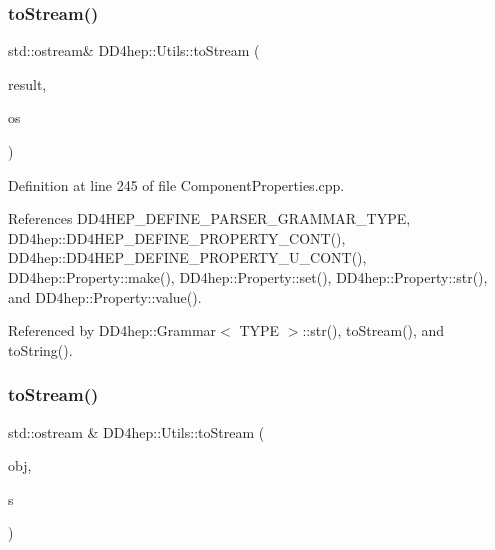 \subsubsection{\texorpdfstring{to\+Stream()}{toStream()}\hspace{0.1cm}{\footnotesize\ttfamily [19/22]}}
{\footnotesize\ttfamily std\+::ostream\& D\+D4hep\+::\+Utils\+::to\+Stream (\begin{DoxyParamCaption}\item[{const \hyperlink{class_d_d4hep_1_1_property}{Property} \&}]{result,  }\item[{std\+::ostream \&}]{os }\end{DoxyParamCaption})}



Definition at line 245 of file Component\+Properties.\+cpp.



References D\+D4\+H\+E\+P\+\_\+\+D\+E\+F\+I\+N\+E\+\_\+\+P\+A\+R\+S\+E\+R\+\_\+\+G\+R\+A\+M\+M\+A\+R\+\_\+\+T\+Y\+PE, D\+D4hep\+::\+D\+D4\+H\+E\+P\+\_\+\+D\+E\+F\+I\+N\+E\+\_\+\+P\+R\+O\+P\+E\+R\+T\+Y\+\_\+\+C\+O\+N\+T(), D\+D4hep\+::\+D\+D4\+H\+E\+P\+\_\+\+D\+E\+F\+I\+N\+E\+\_\+\+P\+R\+O\+P\+E\+R\+T\+Y\+\_\+\+U\+\_\+\+C\+O\+N\+T(), D\+D4hep\+::\+Property\+::make(), D\+D4hep\+::\+Property\+::set(), D\+D4hep\+::\+Property\+::str(), and D\+D4hep\+::\+Property\+::value().



Referenced by D\+D4hep\+::\+Grammar$<$ T\+Y\+P\+E $>$\+::str(), to\+Stream(), and to\+String().

\hypertarget{namespace_d_d4hep_1_1_utils_a2a135f6ca6327240ccb6a2f796c6fc49}{}\label{namespace_d_d4hep_1_1_utils_a2a135f6ca6327240ccb6a2f796c6fc49} 
\subsubsection{\texorpdfstring{to\+Stream()}{toStream()}\hspace{0.1cm}{\footnotesize\ttfamily [20/22]}}
{\footnotesize\ttfamily std\+::ostream \& D\+D4hep\+::\+Utils\+::to\+Stream (\begin{DoxyParamCaption}\item[{const R\+O\+O\+T\+::\+Math\+::\+X\+Y\+Z\+Point \&}]{obj,  }\item[{std\+::ostream \&}]{s }\end{DoxyParamCaption})}




